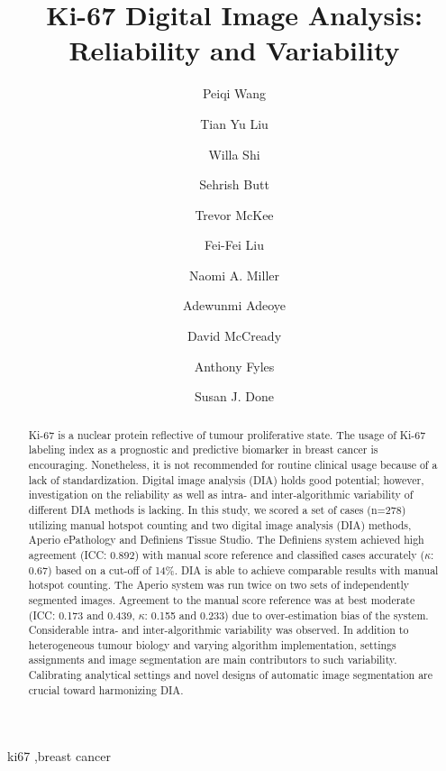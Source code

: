 \documentclass[final,5p,times,twocolumn]{elsarticle}
\begin{document}
\begin{frontmatter}

\title{Ki-67 Digital Image Analysis: Reliability and Variability}
\author[medbio]{Peiqi Wang}
\author[music]{Tian Yu Liu}
\author[pmh]{Willa Shi}
\author[sttarr]{Sehrish Butt}
\author[sttarr]{Trevor McKee}
\author[medbio,pmh]{Fei-Fei Liu}
\author[pmh]{Naomi A. Miller}
\author[pmh]{Adewunmi Adeoye}
\author[pmh]{David McCready}
\author[pmh]{Anthony Fyles}
\author[medbio,pmh]{Susan J. Done}
\address[medbio]{Department of Medical Biophysics, University of Toronto, Canada}
\address[music]{Faculty of Music, University of Toronto, ON, Canada}
\address[pmh]{Princess Margaret Cancer Centre, Canada}
\address[sttarr]{STTARR Medical Diagnostics Imaging Center}

\begin{abstract}
Ki-67 is a nuclear protein reflective of tumour proliferative state. The usage of Ki-67 labeling index as a prognostic and predictive biomarker in breast cancer is encouraging. Nonetheless, it is not recommended for routine clinical usage because of a lack of standardization. Digital image analysis (DIA) holds good potential; however, investigation on the reliability as well as intra- and inter-algorithmic variability of different DIA methods is lacking. In this study, we scored a set of cases (n=278) utilizing manual hotspot counting and two digital image analysis (DIA) methods, Aperio ePathology and Definiens Tissue Studio. The Definiens system achieved high agreement (ICC: 0.892) with manual score reference and classified cases accurately ($\kappa$: 0.67) based on a cut-off of 14\%. DIA is able to achieve comparable results with manual hotspot counting. The Aperio system was run twice on two sets of independently segmented images. Agreement to the manual score reference was at best moderate (ICC: 0.173 and 0.439, $\kappa$: 0.155 and 0.233) due to over-estimation bias of the system. Considerable intra- and inter-algorithmic variability was observed. In addition to heterogeneous tumour biology and varying algorithm implementation, settings assignments and image segmentation are main contributors to such variability. Calibrating analytical settings and novel designs of automatic image segmentation are crucial toward harmonizing DIA.


\end{abstract}

\begin{keyword}
ki67 \sep breast cancer
\end{keyword}

\end{frontmatter}
\end{document}
